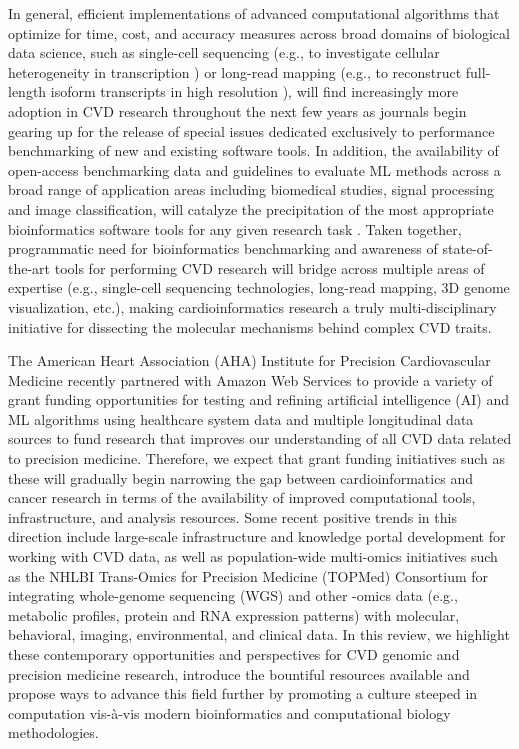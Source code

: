 \documentclass[letter]{bib}
\begin{document}
In general, efficient implementations of advanced computational algorithms that optimize for time, cost, and accuracy measures across broad domains of biological data science, such as single-cell sequencing \citep{Becht:2018:Evaluation} (e.g., to investigate cellular heterogeneity in transcription \citep{Wirka:2018:Advancesa}) or long-read mapping \citep{Li:2018:Minimap2} (e.g., to reconstruct full-length isoform transcripts in high resolution \citep{Wirka:2018:Advancesa}), will find increasingly more adoption in CVD research throughout the next few years as journals begin gearing up for the release of special issues dedicated exclusively to performance benchmarking of new and existing software tools.  In addition, the availability of open-access benchmarking data and guidelines to evaluate ML methods across a broad range of application areas including biomedical studies, signal processing and image classification, will catalyze the precipitation of the most appropriate bioinformatics software tools for any given research task \citep{Olson:2017:PMLB,Weber:2018:Essential}.  Taken together, programmatic need for bioinformatics benchmarking and awareness of state-of-the-art tools for performing CVD research will bridge across multiple areas of expertise (e.g., single-cell sequencing technologies, long-read mapping, 3D genome visualization, etc.), making cardioinformatics research a truly multi-disciplinary initiative for dissecting the molecular mechanisms behind complex CVD traits.   


The American Heart Association (AHA) Institute for Precision Cardiovascular Medicine recently partnered with Amazon Web Services to provide a variety of grant funding opportunities for testing and refining artificial intelligence (AI) and ML algorithms using healthcare system data and multiple longitudinal data sources to fund research that improves our understanding of all CVD data related to precision medicine.  Therefore, we expect that grant funding initiatives such as these will gradually begin narrowing the gap between cardioinformatics and cancer research in terms of the availability of improved computational tools, infrastructure, and analysis resources.  Some recent positive trends in this direction include large-scale infrastructure and knowledge portal development \citep{Khomtchouk:2019:HeartBioPortal,Kass-Hout:2018:American,Crawford:2018:Cerebrovascular,Fernandes:2018:CVDdb} for working with CVD data, as well as population-wide multi-omics initiatives such as the NHLBI Trans-Omics for Precision Medicine (TOPMed) Consortium \citep{NHLBI:2014:TransOmics} for integrating whole-genome sequencing (WGS) and other -omics data (e.g., metabolic profiles, protein and RNA expression patterns) with molecular, behavioral, imaging, environmental, and clinical data.  In this review, we highlight these contemporary opportunities and perspectives for CVD genomic and precision medicine research, introduce the bountiful resources available and propose ways to advance this field further by promoting a culture steeped in computation vis-\`{a}-vis modern bioinformatics and computational biology methodologies.
\end{document}
